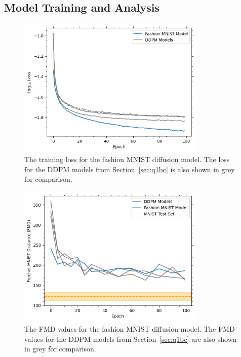 \subsection{Model Training and Analysis}\label{subsec:model-training}
\begin{figure}[t]
    \centering
    \includegraphics[width=0.8\textwidth]{figures/q2_training_loss}
    \caption{The training loss for the fashion MNIST diffusion model.
        The loss for the DDPM models from Section~\eqref{sec:q1bc} is also shown in grey for comparison.}
    \label{fig:q2_training_loss}
\end{figure}

\begin{figure}[t]
    \centering
    \includegraphics[width=0.8\textwidth]{figures/q2_fmd}
    \caption{The FMD values for the fashion MNIST diffusion model.
        The FMD values for the DDPM models from Section~\eqref{sec:q1bc} are also shown in grey for comparison.}
    \label{fig:q2_fmd}
\end{figure}

